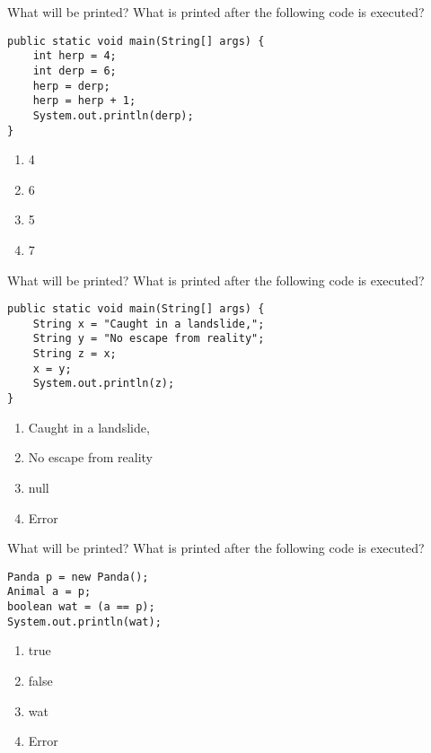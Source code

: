 \documentclass[9pt]{beamer}
\begin{document}
\begin{frame}[fragile]{What will be printed?}
  What is printed after the following code is executed?
  \begin{lstlisting}
public static void main(String[] args) {
    int herp = 4;
    int derp = 6;
    herp = derp;
    herp = herp + 1;
    System.out.println(derp);
}
  \end{lstlisting}
  \begin{enumerate}
    \item
      4
    \item
      \alert<2>{6}
    \item
      5
    \item
      7
  \end{enumerate}
\end{frame}

\begin{frame}[fragile]{What will be printed?}
  What is printed after the following code is executed?
  \begin{lstlisting}
public static void main(String[] args) {
    String x = "Caught in a landslide,";
    String y = "No escape from reality";
    String z = x;
    x = y;
    System.out.println(z);
}
  \end{lstlisting}
  \begin{enumerate}
    \item
      \alert<2>{Caught in a landslide,}
    \item
      No escape from reality
    \item
      null
    \item
      Error
  \end{enumerate}
\end{frame}

\begin{frame}[fragile]{What will be printed?}
  What is printed after the following code is executed?
  \begin{lstlisting}
Panda p = new Panda();
Animal a = p;
boolean wat = (a == p);
System.out.println(wat);
  \end{lstlisting}
  \begin{enumerate}
    \item
      \alert<2>{true}
    \item
      false
    \item
      wat
    \item Error
  \end{enumerate}
\end{frame}
\end{document}

